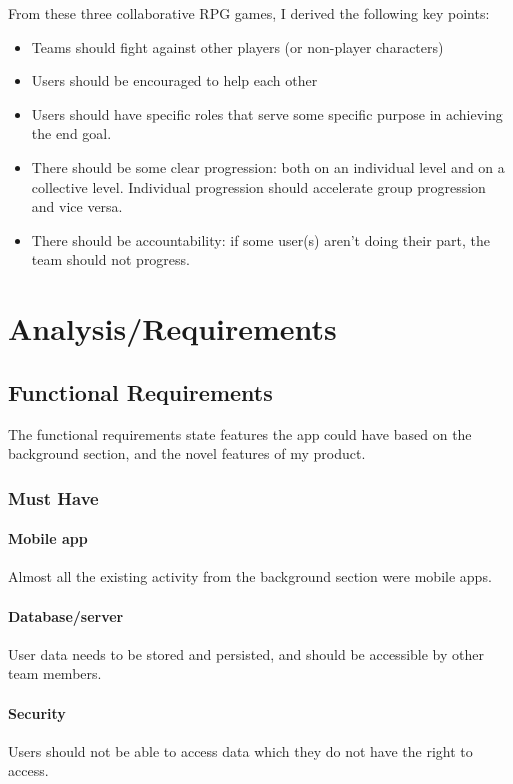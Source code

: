 \documentclass{l4proj}
\begin{document}
From these three collaborative RPG games, I derived the following key points:
\begin{itemize}    
    \item
      Teams should fight against other players (or non-player characters)
    \item
      Users should be encouraged to help each other
    \item
      Users should have specific roles that serve some specific purpose in achieving the end goal.
    \item 
      There should be some clear progression: both on an individual level and on a collective level. Individual progression should accelerate group progression and vice versa.
    \item 
      There should be accountability: if some user(s) aren't doing their part, the team should not progress.
\end{itemize}


\chapter{Analysis/Requirements}
\section{Functional Requirements}
The functional requirements state features the app could have based on the background section, and the novel features of my product.

\subsection{Must Have}

  \subsubsection{Mobile app} Almost all the existing activity from the background section were mobile apps. 

  \subsubsection{Database/server} User data needs to be stored and persisted, and should be accessible by other team members. 

  \subsubsection{Security} Users should not be able to access data which they do not have the right to access. 
\end{document}
